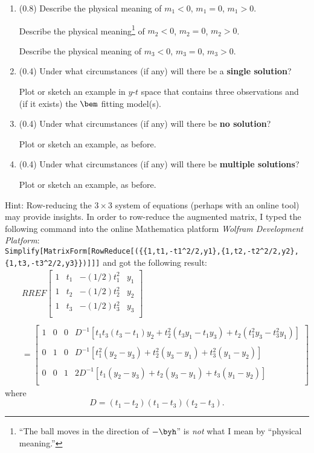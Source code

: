 \documentclass[11pt,titlepage,fleqn]{article}
\begin{document}
\begin{enumerate}
\item (0.8) Describe the physical meaning of $m_1 < 0$, $m_1 = 0$, $m_1 > 0$.

Describe the physical meaning\footnote{``The ball moves in the direction of $-\byh$'' is {\em not} what I mean by ``physical meaning.''} of $m_2 < 0$, $m_2 = 0$, $m_2 > 0$.

Describe the physical meaning of $m_3 < 0$, $m_3 = 0$, $m_3 > 0$.

\item (0.4) Under what circumstances (if any) will there be a {\bf single solution}?

Plot or sketch an example in $y$-$t$ space that contains three observations and (if it exists) the $\bem$ fitting model(s).

\item (0.4) Under what circumstances (if any) will there be {\bf no solution}?

Plot or sketch an example, as before.

\item (0.4) Under what circumstances (if any) will there be {\bf multiple solutions}?

Plot or sketch an example, as before.
\end{enumerate}
%
Hint: Row-reducing the $3 \times 3$ system of equations (perhaps with an online tool) may provide insights. 
In order to row-reduce the augmented matrix, I typed the following command into the online Mathematica platform {\em Wolfram Development Platform}: \\
\verb+Simplify[MatrixForm[RowReduce[({{1,t1,-t1^2/2,y1},{1,t2,-t2^2/2,y2},{1,t3,-t3^2/2,y3}})]]]+
and got the following result:
%
\begin{eqnarray}
&& RREF \left[
\begin{array}{cccc}
1 & t_1 & -(1/2)t_1^2 & y_1 \\
1 & t_2 & -(1/2)t_2^2 & y_2 \\
1 & t_3 & -(1/2)t_3^2 & y_3 \\
\end{array}
\right]
\nonumber \\ \nonumber \\
&& =
\left[
\begin{array}{cccc}
1 & 0 & 0 & D^{-1}\left[t_1 t_3(t_3-t_1)y_2 + t_2^2(t_3 y_1 - t_1 y_3) + t_2(t_1^2 y_3 - t_3^2 y_1) \right] \\
& & & \\
0 & 1 & 0 & D^{-1}\left[ t_1^2(y_2-y_3) + t_2^2(y_3 -y_1) + t_3^2(y_1-y_2)\right] \\
& & & \\
0 & 0 & 1 & 2D^{-1}\left[ t_1(y_2-y_3) + t_2(y_3 -y_1) + t_3(y_1-y_2)\right] \\
\end{array}
\right]
\label{rref}
\end{eqnarray}
%
where
%
\begin{equation}
D = (t_1-t_2)(t_1-t_3)(t_2-t_3).
\end{equation}
\end{document}
